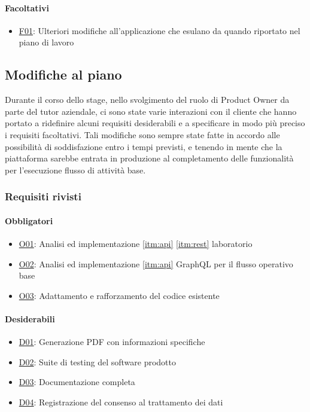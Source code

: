 \paragraph{Facoltativi}
\begin{itemize}
    \item \underline{F01}: Ulteriori modifiche all’applicazione che esulano da quando riportato nel piano di lavoro
\end{itemize}
\subsection{Modifiche al piano}
Durante il corso dello stage, nello svolgimento del ruolo di Product Owner da parte del tutor aziendale, ci sono state varie interazioni con il cliente che hanno portato a ridefinire alcuni requisiti desiderabili e a specificare in modo più preciso i requisiti facoltativi. Tali modifiche sono sempre state fatte in accordo alle possibilità di soddisfazione entro i tempi previsti, e tenendo in mente che la piattaforma sarebbe entrata in produzione al completamento delle funzionalità per l'esecuzione flusso di attività base.
\subsubsection{Requisiti rivisti}
\label{sec:reqs}
\paragraph{Obbligatori}
\begin{itemize}
    \item \underline{O01}: Analisi ed implementazione \ref{itm:api} \ref{itm:rest} laboratorio
    \item \underline{O02}: Analisi ed implementazione \ref{itm:api} GraphQL per il flusso operativo base
    \item \underline{O03}: Adattamento e rafforzamento del codice esistente
\end{itemize}
\vspace{-15pt}
\paragraph{Desiderabili}
\begin{itemize}
    \item \underline{D01}: Generazione PDF con informazioni specifiche
    \item \underline{D02}: Suite di testing del software prodotto
    \item \underline{D03}: Documentazione completa
    \item \underline{D04}: Registrazione del consenso al trattamento dei dati
\end{itemize}
\vspace{-15pt}
